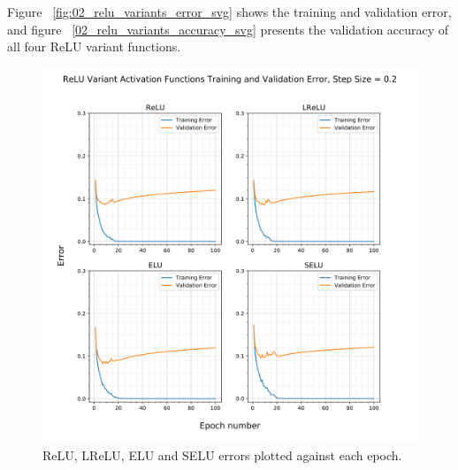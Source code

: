 \documentclass{article}
\begin{document}
Figure ~\ref{fig:02_relu_variants_error_svg} shows the training and validation error, and figure ~\ref{02_relu_variants_accuracy_svg} presents the validation accuracy of all four ReLU variant functions.

\begin{figure}[tb]
\vskip 5mm
\begin{center}
\centerline{\includegraphics[width=\columnwidth]{02_relu_variants_error_svg}}
\caption{ReLU, LReLU, ELU and SELU errors plotted against each epoch.}
\label{fig:relu-variants-error}
\end{center}
\vskip -5mm
\end{figure}
\end{document}

